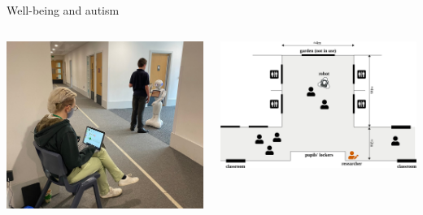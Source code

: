 \documentclass[xcolor=table]{beamer}
\begin{document}
\begin{frame}{Well-being and autism}
    \begin{columns}
        \begin{column}{0.5\linewidth}
            \begin{center}
                \includegraphics[width=\linewidth]{figs/robots4sen/location.jpg}
            \end{center}
        \end{column}
        \begin{column}{0.5\linewidth}
            \begin{center}
                \includegraphics[width=\linewidth]{figs/robots4sen/setup}
            \end{center}
        \end{column}
    \end{columns}
\end{frame}
\end{document}
